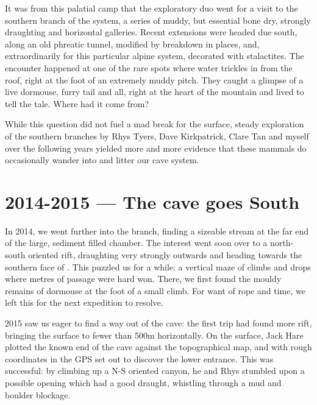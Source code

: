 It was from this palatial camp that the exploratory duo went for a visit to the southern branch of the system, a series of muddy, but essential bone dry, strongly draughting and horizontal galleries. Recent extensions were headed due south, along an old phreatic tunnel, modified by breakdown in places, and, extraordinarily for this particular alpine system, decorated with stalactites. The encounter happened at one of the rare spots where water trickles in from the roof, right at the foot of an extremely muddy pitch. They caught a glimpse of a live dormouse, furry tail and all, right at the heart of the mountain and lived to tell the tale. Where had it come from? 

While this question did not fuel a mad break for the surface, steady exploration of the southern branches by Rhys Tyers, Dave Kirkpatrick, Clare Tan and myself over the following years yielded more and more evidence that these mammals do occasionally wander into and litter our cave system.

\section{2014-2015 --- The cave goes South}

In 2014, we went further into the  branch, finding a sizeable stream at the far end of the large, sediment filled  chamber. The interest went soon over to a north-south oriented rift, draughting very strongly outwards and heading towards the southern face of . This puzzled us for a while: a vertical maze of climbs and drops where metres of passage were hard won. There, we first found the mouldy remains of dormouse at the foot of a small climb. For want of rope and time, we left this for the next expedition to resolve.



2015 saw us eager to find a way out of the cave: the first trip had found more rift, bringing the surface to fewer than 500m horizontally. On the surface, Jack Hare plotted the known end of the cave against the topographical map, and with rough coordinates in the GPS set out to discover the lower entrance. This was successful: by climbing up a N-S oriented canyon, he and Rhys stumbled upon a possible opening which had a good draught, whistling through a mud and boulder blockage. 

